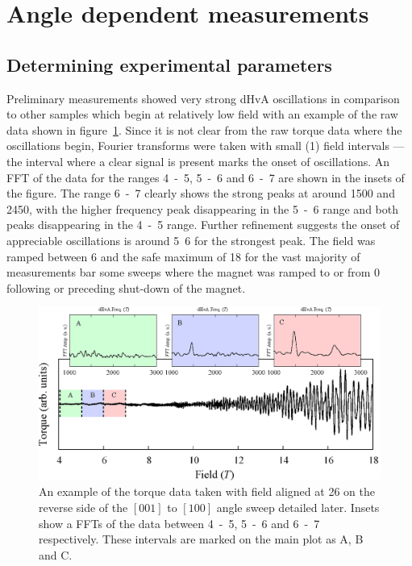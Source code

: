 
\section{Angle dependent measurements}
    \label{Sec:ResD:AngleDependentMeasurements}

\subsection{Determining experimental parameters}

Preliminary measurements showed very strong \ac{dHvA} oscillations in comparison to other samples which begin at relatively low field with an example of the raw data shown in figure~\ref{Fig:ResD:RawOscillations}. Since it is not clear from the raw torque data where the oscillations begin, Fourier transforms were taken with small (\unit{1}{\tesla}) field intervals --- the interval where a clear signal is present marks the onset of oscillations. An \ac{FFT} of the data for the ranges \unit{4-5}{\tesla}, \unit{5-6}{\tesla} and \unit{6-7}{\tesla} are shown in the insets of the figure. The range \unit{6-7}{\tesla} clearly shows the strong peaks at around \unit{1500}{\tesla} and \unit{2450}{\tesla}, with the higher frequency peak disappearing in the \unit{5-6}{\tesla} range and both peaks disappearing in the \unit{4-5}{\tesla} range. Further refinement suggests the onset of appreciable oscillations is around \unit{5.6}{\tesla} for the strongest peak. The field was ramped between \unit{6}{\tesla} and the safe maximum of \unit{18}{\tesla} for the vast majority of measurements bar some sweeps where the magnet was ramped to or from \unit{0}{\tesla} following or preceding shut-down of the magnet.

\begin{figure}[htbp]
    \begin{center}
        \includegraphics[scale=0.7]{Chapter-dHvABaFe2P2/Figures/AngleDepMeasurements/RawOscillations/RawOscillations}
        \caption{An example of the torque data taken with field aligned at \unit{26}{\degree} on the reverse side of the $[001]$ to $[100]$ angle sweep detailed later. Insets show a \acp{FFT} of the data between \unit{4-5}{\tesla}, \unit{5-6}{\tesla} and \unit{6-7}{\tesla} respectively. These intervals are marked on the main plot as A, B and C.}
        \label{Fig:ResD:RawOscillations}
    \end{center}
\end{figure}


